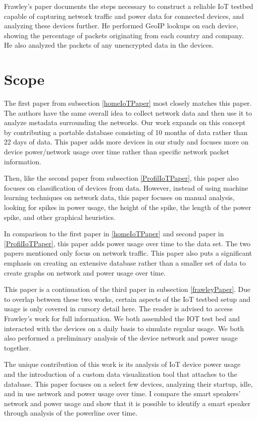 Frawley's paper documents the steps necessary to construct a reliable IoT testbed capable of capturing network traffic and power data for connected devices, and analyzing these devices further. He performed GeoIP\cite{maxmind} lookups on each device, showing the percentage of packets originating from each country and company. He also analyzed the packets of any unencrypted data in the devices.

\section{Scope}
\label{Scope}
The first paper from subsection \ref{homeIoTPaper} most closely matches this paper. The authors have the same overall idea to collect network data and then use it to analyze metadata surrounding the networks. Our work expands on this concept by contributing a portable database consisting of 10 months of data rather than 22 days of data. This paper adds more devices in our study and focuses more on device power/network usage over time rather than specific network packet information.

Then, like the second paper from subsection \ref{ProfilIoTPaper}, this paper also focuses on classification of devices from data. However, instead of using machine learning techniques on network data, this paper focuses on manual analysis, looking for spikes in power usage, the height of the spike, the length of the power spike, and other graphical heuristics.

In comparison to the first paper in \ref{homeIoTPaper} and second paper in \ref{ProfilIoTPaper}, this paper adds power usage over time to the data set. The two papers mentioned only focus on network traffic. This paper also puts a significant emphasis on creating an extensive database rather than a smaller set of data to create graphs on network and power usage over time.

This paper is a continuation of the third paper in subsection \ref{frawleyPaper}. Due to overlap between these two works, certain aspects of the IoT testbed setup and usage is only covered in cursory detail here. The reader is advised to access Frawley's work for full information. We both assembled the IOT test bed and interacted with the devices on a daily basis to simulate regular usage. We both also performed a preliminary analysis of the device network and power usage together.

The unique contribution of this work is its analysis of IoT device power usage and the introduction of a custom data visualization tool that attaches to the database. This paper focuses on a select few devices, analyzing their startup, idle, and in use network and power usage over time. I compare the smart speakers' network and power usage and show that it is possible to identify a smart speaker through analysis of the powerline over time.


